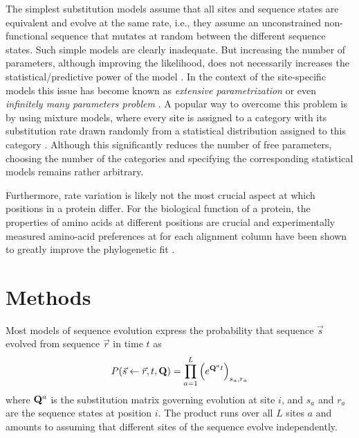 \documentclass[aps,rmp, onecolumn]{revtex4}
\newcommand{\bq}{\begin{equation}}
\newcommand{\eq}{\end{equation}}
\newcommand{\mat}[1]{{\bf #1}}
\begin{document}
The simplest substitution models assume that all sites and sequence states are equivalent and evolve at the same rate, i.e., they assume an unconstrained non-functional sequence that mutates at random between the different sequence states.
Such simple models are clearly inadequate.
But increasing the number of parameters, although improving the likelihood, does not necessarily increases the statistical/predictive power of the model \cite{scheffler2014validity}.
In the context of the site-specific models this issue has become known as {\em extensive parametrization} or even {\em infinitely many parameters problem} \cite{felsenstein2001taking,Rodrigue557,kumar2011statistics,spielman2016extensively}.
%
A popular way to overcome this problem is by using mixture models, where every site is assigned to a category with its substitution rate drawn randomly from a statistical distribution assigned to this category \cite{blanquart2008site,mayrose2005gamma,jia2014impact,kosakovsky2004simple,le2012modeling,jayaswal2014mixture}.
Although this significantly reduces the number of free parameters, choosing the number of the categories and specifying the corresponding statistical models remains rather arbitrary.

Furthermore, rate variation is likely not the most crucial aspect at which positions in a protein differ.
For the biological function of a protein, the properties of amino acids at different positions are crucial and experimentally measured amino-acid preferences at for each alignment column have been shown to greatly improve the phylogenetic fit \cite{bloom2014experimentally,bloom2014experimentally1}.



\section{Methods}
Most models of sequence evolution express the probability that sequence $\vec{s}$ evolved from sequence $\vec{r}$ in time $t$ as
\bq
P(\vec{s}\leftarrow \vec{r},t,\mat{Q}) = \prod_{a=1}^L \left(e^{\mat{Q}^{a} t}\right)_{s_{a},r_{a}}
\label{eq:P_prob}
\eq
where $\mat{Q}^{a}$ is the substitution matrix governing evolution at site $i$, and $s_{a}$ and $r_{a}$ are the sequence states at position $i$.
The product runs over all $L$ sites $a$ and amounts to assuming that different sites of the sequence evolve independently.
\end{document}

